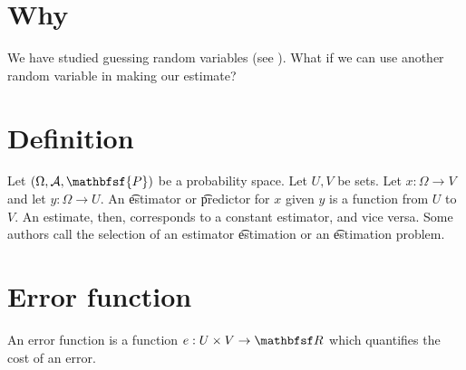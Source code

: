 
\section*{Why}

We have studied guessing random variables (see ).
What if we can use another random variable in making our estimate?

\section*{Definition}

Let $(\Omega , \mathcal{A} , \mathbfsf{P} )$ be a probability space.
Let $U, V$ be sets.
Let $x: \Omega  \to V$ and let $y: \Omega  \to U$.
An \t{estimator} or \t{predictor} for $x$ given $y$ is a function from $U$ to $V$.
An estimate, then, corresponds to a constant estimator, and vice versa.
Some authors call the selection of an estimator \t{estimation} or an \t{estimation problem}.

\section*{Error function}

An error function is a function $e: U \times  V \to \R $ which quantifies the cost of an error.

\blankpage